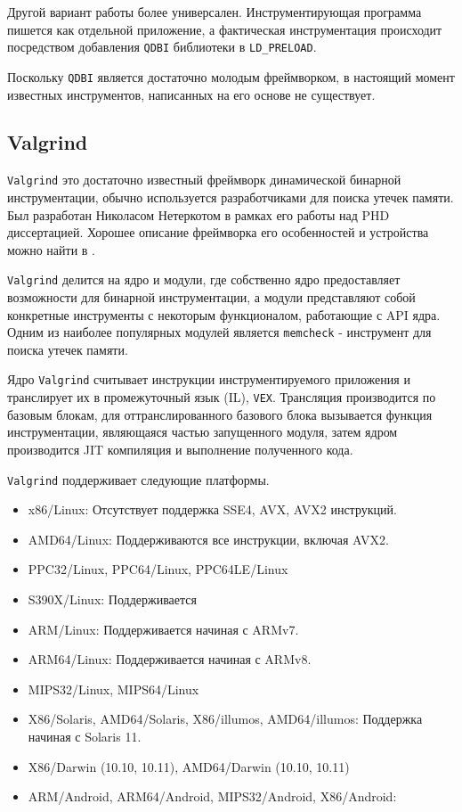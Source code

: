 Другой вариант работы более универсален. Инструментирующая программа пишется как отдельной приложение, а фактическая инструментация происходит посредством добавления \texttt{QDBI} библиотеки в \texttt{LD\_PRELOAD}.

Поскольку \texttt{QDBI} является достаточно молодым фреймворком, в настоящий момент известных инструментов, написанных на его основе не существует.


\subsection{Valgrind}

\texttt{Valgrind} это достаточно известный фреймворк динамической бинарной инструментации, обычно используется разработчиками для поиска утечек памяти. Был разработан Николасом Нетеркотом в рамках его работы над PHD диссертацией. Хорошее описание фреймворка его особенностей и устройства можно найти в \cite{VALGRIND}.


\texttt{Valgrind} делится на ядро и модули, где собственно ядро предоставляет возможности для бинарной инструментации, а модули представляют собой конкретные инструменты с некоторым функционалом, работающие с API ядра. Одним из наиболее популярных модулей является \texttt{memcheck} - инструмент для поиска утечек памяти.

Ядро \texttt{Valgrind} считывает инструкции инструментируемого приложения и транслирует их в промежуточный язык (IL), \texttt{VEX}. Трансляция производится по базовым блокам, для оттранслированного базового блока вызывается функция инструментации, являющаяся частью запущенного модуля, затем ядром производится JIT компиляция и выполнение полученного кода.

\texttt{Valgrind} поддерживает следующие платформы.

\begin{itemize}

    \item x86/Linux: Отсутствует поддержка SSE4, AVX, AVX2 инструкций.
    \item AMD64/Linux: Поддерживаются все инструкции, включая AVX2.
    \item PPC32/Linux, PPC64/Linux, PPC64LE/Linux
    \item S390X/Linux: Поддерживается
    \item ARM/Linux: Поддерживается начиная с ARMv7.
    \item ARM64/Linux: Поддерживается начиная с ARMv8.
    \item MIPS32/Linux, MIPS64/Linux
    \item X86/Solaris, AMD64/Solaris, X86/illumos, AMD64/illumos: Поддержка начиная с Solaris 11.
    \item X86/Darwin (10.10, 10.11), AMD64/Darwin (10.10, 10.11)
    \item ARM/Android, ARM64/Android, MIPS32/Android, X86/Android:
\end{itemize}

